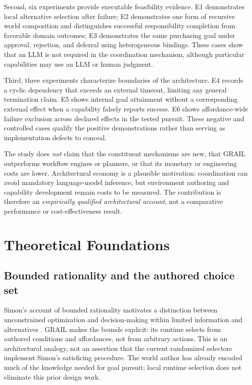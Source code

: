 \documentclass[11pt]{article}
\begin{document}
Second, six experiments provide executable feasibility evidence. E1 demonstrates local alternative selection after failure; E2 demonstrates one form of recursive world composition and distinguishes successful responsibility completion from favorable domain outcomes; E3 demonstrates the same purchasing goal under approval, rejection, and deferral using heterogeneous bindings. These cases show that an LLM is not required in the coordination mechanism, although particular capabilities may use an LLM or human judgment.

Third, three experiments characterize boundaries of the architecture. E4 records a cyclic dependency that exceeds an external timeout, limiting any general termination claim. E5 shows internal goal attainment without a corresponding external effect when a capability falsely reports success. E6 shows affordance-wide failure exclusion across declared effects in the tested pursuit. These negative and controlled cases qualify the positive demonstrations rather than serving as implementation defects to conceal.

The study does \emph{not} claim that the constituent mechanisms are new, that GRAIL outperforms workflow engines or planners, or that its monetary or engineering costs are lower. Architectural economy is a plausible motivation: coordination can avoid mandatory language-model inference, but environment authoring and capability development remain costs to be measured. The contribution is therefore an \emph{empirically qualified architectural account}, not a comparative performance or cost-effectiveness result.


\section{Theoretical Foundations}
\subsection{Bounded rationality and the authored choice set}
Simon's account of bounded rationality motivates a distinction between unconstrained optimization and decision-making within limited information and alternatives \cite{Simon1955}. GRAIL makes the bounds explicit: its runtime selects from authored conditions and affordances, not from arbitrary actions. This is an architectural analogy, not an assertion that the current randomized selectors implement Simon's satisficing procedure. The world author has already encoded much of the knowledge needed for goal pursuit; local runtime selection does not eliminate this prior design work.
\end{document}
